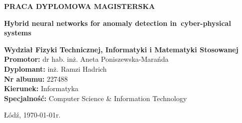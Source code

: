 \pagestyle{empty}
\begin{center}

{\large \textbf{PRACA DYPLOMOWA MAGISTERSKA}}
\vspace{6cm}


{\fontsize{18}{18}\selectfont \textbf{Hybrid neural networks for anomaly detection in~cyber-physical systems}}
\end{center}
\normalsize

\vspace{6cm}
\noindent\textbf{Wydział Fizyki Technicznej, Informatyki i Matematyki Stosowanej \\
Promotor:} dr hab. inż. Aneta Poniszewska-Marańda\\
\textbf{Dyplomant:} inż. Ramzi Hadrich\\
\textbf{Nr albumu:} 227488\\
\textbf{Kierunek:} Informatyka\\
\textbf{Specjalność:} Computer Science \& Information Technology\\
\begin{center}
    Łódź, \today r.
\end{center}


